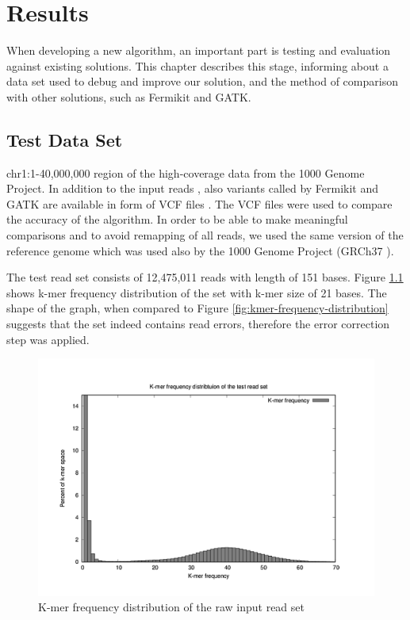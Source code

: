 \chapter{Results}
\label{chap:results}

When developing a new algorithm, an important part is testing and evaluation
against existing solutions. This chapter describes this stage, informing about a data set used to debug and improve our solution, and the method of comparison with other solutions, such as Fermikit and GATK. 

\section{Test Data Set}
\label{sec:test-data-set}

 chr1:1-40,000,000 region of the high-coverage
data from the 1000 Genome Project. In addition to the input reads \cite{testreads}, also variants called by Fermikit and GATK are available in form of VCF files \cite{testvcf}. The VCF files were used to compare the accuracy of the algorithm. In order to be able to make meaningful comparisons and to avoid remapping of all reads, we used the same version of the reference genome which was used also by the 1000 Genome Project (GRCh37 \cite{testref}).

The test read set consists of 12,475,011 reads with length of 151 bases. Figure \ref{fig:test-kmer-frequency-distribution} shows k-mer frequency distribution of the set with k-mer size of 21 bases. The shape of the graph, when compared to Figure \ref{fig:kmer-frequency-distribution} suggests that the set indeed contains read errors, therefore the error correction step was applied.

\begin{figure}[h]
\centering
\includegraphics{img/test-kmer-frequency-distribution.pdf}
\caption{K-mer frequency distribution of the raw input read set}
\label{fig:test-kmer-frequency-distribution}
\end{figure}

